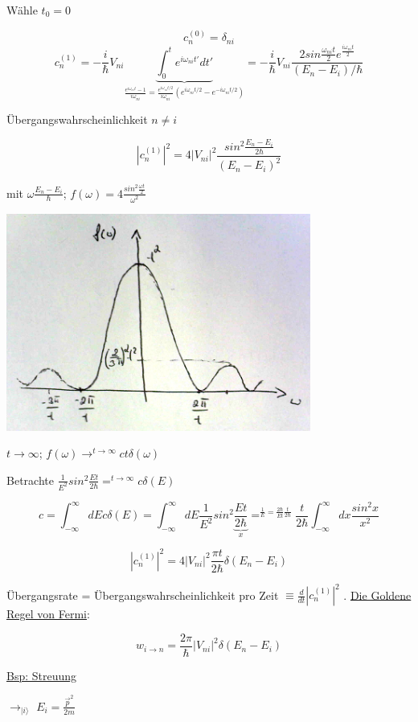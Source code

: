 Wähle \(t_0 = 0\)

\[ c^{(0)}_n = \delta_{ni}\]
\[ c^{(1)}_n = -\frac{i}{\hbar} V_{ni}\underbrace{\int_0^t e^{i\omega_{ni}t'}dt'}_{\frac{e^{i\omega_{ni}t}-1}{i\omega_{ni}}=\frac{e^{i\omega_{ni}t/2}}{i\omega_{ni}}(e^{i\omega_{ni}t/2}-e^{-i\omega_{ni}t/2})}=-\frac{i}{\hbar}V_{ni}\frac{2sin\frac{\omega_{ni}t}{2}e^{\frac{i\omega_{ni}t}{2}}}{(E_n-E_i)/\hbar}\]

Übergangswahrscheinlichkeit \(n\neq i\)

\[ |c^{(1)}_n|^2 = 4|V_{ni}|^2 \frac{sin^2\frac{E_n-E_i}{2\hbar}}{(E_n-E_i)^2} \]

mit \(\omega \frac{E_n-E_i}{\hbar}\); \(f(\omega) = 4\frac{sin^2\frac{\omega t}{2}}{\omega^2}\)


\includegraphics[width=0.75\textwidth]{kap03_07.png}

\(t\rightarrow \infty\); \(f(\omega) \rightarrow^{t\rightarrow \infty} c t\delta(\omega)\)

Betrachte \(\frac{1}{E^2}sin^2 \frac{Et}{2\hbar} =^{t\rightarrow \infty} c\delta(E)\)

\[ c = \int_{-\infty}^{\infty} dE c\delta(E) = \int_{-\infty}^{\infty} dE \frac{1}{E^2}sin^2\frac{Et}{\underbrace{2\hbar}_{x}} =^{\frac{1}{E}=\frac{2\hbar}{Et}\frac{t}{2\hbar}} \frac{t}{2\hbar} \int_{-\infty}^{\infty} dx \frac{sin^2 x}{x^2} \]

\[ |c^{(1)}_n|^2 = 4|V_{ni}|^2 \frac{\pi t}{2\hbar} \delta(E_n-E_i) \]

Übergangsrate = Übergangswahrscheinlichkeit pro Zeit \(\equiv \frac{d}{dt}|c^{(1)}_n|^2\) . \underline{Die Goldene Regel von Fermi}:

\[\boxed{w_{i\rightarrow n} = \frac{2\pi}{\hbar} |V_{ni}|^2 \delta(E_n-E_i)}\]


\underline{Bsp: Streuung}

\(\rightarrow_{|i\rangle }\) \(E_i = \frac{\vec p^2}{2m}\)

